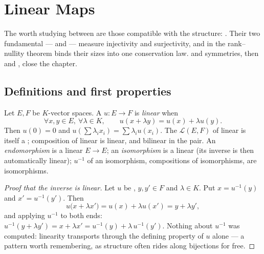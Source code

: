 \chapter{Linear Maps}\label{ch:b1:linmaps}

The  worth studying between  are those compatible
with the structure: \emph{}. Their two fundamental
 ---  and  --- measure injectivity and
surjectivity, and in  the rank--nullity theorem
binds their sizes into one conservation law.  and
symmetries, then  and , close the chapter.

\section{Definitions and first properties}

\begin{definition}\label{def:b1:linmaps:def}
Let $E, F$ be $K$-vector spaces. A  $u \colon E \to F$ is
\emph{linear} when
\[
\forall x, y \in E,\ \forall \lambda \in K, \qquad
u(x + \lambda y) = u(x) + \lambda u(y).
\]
Then $u(0) = 0$ and $u(\sum \lambda_i x_i) = \sum \lambda_i u(x_i)$.
The  $\mathcal{L}(E, F)$ of linear  is itself a ;
composition of linear  is linear, and bilinear in the pair. An
\emph{endomorphism} is a linear $E \to E$; an \emph{isomorphism} is
a  linear  (its inverse is then automatically linear);
$u^{-1}$ of an isomorphism, compositions of isomorphisms, are
isomorphisms.
\end{definition}

\begin{proof}[Proof that the inverse is linear]
Let $u$ be  , $y, y' \in F$ and $\lambda \in K$.
Put $x = u^{-1}(y)$ and $x' = u^{-1}(y')$. Then
\[
u\bigl(x + \lambda x'\bigr) = u(x) + \lambda u(x')
= y + \lambda y' ,
\]
and applying $u^{-1}$ to both ends: $u^{-1}(y + \lambda y') = x
+ \lambda x' = u^{-1}(y) + \lambda\,u^{-1}(y')$. Nothing about
$u^{-1}$ was computed: linearity transports through the
defining property of $u$ alone --- a pattern worth remembering,
as structure often rides along bijections for free.
\end{proof}

